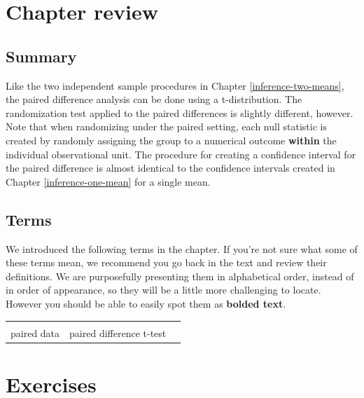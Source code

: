 \documentclass[
  10pt,
  openany]{book}
\begin{document}

\clearpage

\hypertarget{chp21-review}{%
\section{Chapter review}\label{chp21-review}}

\hypertarget{summary-13}{%
\subsection{Summary}\label{summary-13}}

Like the two independent sample procedures in Chapter \ref{inference-two-means}, the paired difference analysis can be done using a t-distribution.
The randomization test applied to the paired differences is slightly different, however.
Note that when randomizing under the paired setting, each null statistic is created by randomly assigning the group to a numerical outcome \textbf{within} the individual observational unit.
The procedure for creating a confidence interval for the paired difference is almost identical to the confidence intervals created in Chapter \ref{inference-one-mean} for a single mean.

\hypertarget{terms-13}{%
\subsection{Terms}\label{terms-13}}

We introduced the following terms in the chapter.
If you're not sure what some of these terms mean, we recommend you go back in the text and review their definitions.
We are purposefully presenting them in alphabetical order, instead of in order of appearance, so they will be a little more challenging to locate.
However you should be able to easily spot them as \textbf{bolded text}.

\begin{tabu} to 
\toprule
{} &  & \\
paired data & paired difference t-test & \\
\bottomrule
\end{tabu}

\clearpage

\hypertarget{chp21-exercises}{%
\section{Exercises}\label{chp21-exercises}}
\end{document}
